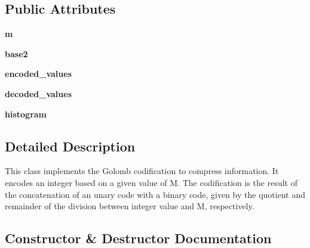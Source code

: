 \subsection*{Public Attributes}
\begin{DoxyCompactItemize}
\item 
\mbox{\label{classgolomb_1_1Golomb_aae43cf7f6c30cd774124d3f44e50bf83}} 
{\bfseries m}
\item 
\mbox{\label{classgolomb_1_1Golomb_ab8a0c7a5b43d8295d1775b4a77c46dc3}} 
{\bfseries base2}
\item 
\mbox{\label{classgolomb_1_1Golomb_aaa2eb9bb0790f466aa0f8c79d4f87207}} 
{\bfseries encoded\+\_\+values}
\item 
\mbox{\label{classgolomb_1_1Golomb_a0bf2b76444c26fcc7a5c3c49ba28cef4}} 
{\bfseries decoded\+\_\+values}
\item 
\mbox{\label{classgolomb_1_1Golomb_a6614399572597611f7d481c670d74695}} 
{\bfseries histogram}
\end{DoxyCompactItemize}


\subsection{Detailed Description}
\begin{DoxyVerb}This class implements the Golomb codification to compress information.
It encodes an integer based on a given value of M. 
The codification is the result of the concatenation of an unary code with a binary code,
given by the quotient and remainder of the division between integer value and M, respectively.
\end{DoxyVerb}
 

\subsection{Constructor \& Destructor Documentation}
\mbox{\label{classgolomb_1_1Golomb_a800ebf96bcd5fde678d266835d301343}} 
